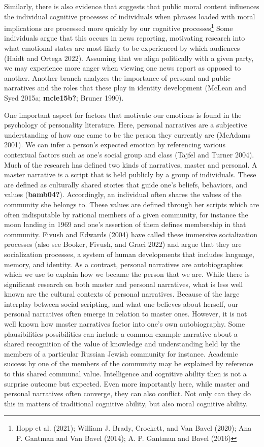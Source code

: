 \documentclass[12pt]{book}
\theoremstyle{definition}
\theoremstyle{remark}
\begin{document}
Similarly, there is also evidence that suggests that public moral content influences the individual cognitive processes of individuals when phrases loaded with moral implications are processed more quickly by our cognitive processes\footnote{Hopp et al. (2021); William J. Brady, Crockett, and Van Bavel (2020); Ana P. Gantman and Van Bavel (2014); A. P. Gantman and Bavel (2016)} Some individuals argue that this occurs in news reporting, motivating research into what emotional states are most likely to be experienced by which audiences (Haidt and Ortega 2022). Assuming that we align politically with a given party, we may experience more anger when viewing one news report as opposed to another. Another branch analyzes the importance of personal and public narratives and the roles that these play in identity development (McLean and Syed 2015a; \textbf{mcle15b?}; Bruner 1990).

One important aspect for factors that motivate our emotions is found in the psychology of personality literature. Here, personal narratives are a subjective understanding of how one came to be the person they currently are (McAdams 2001). We can infer a person's expected emotion by referencing various contextual factors such as one's social group and class (Tajfel and Turner 2004). Much of the research has defined two kinds of narratives, master and personal. A master narrative is a script that is held publicly by a group of individuals. These are defined as culturally shared stories that guide one's beliefs, behaviors, and values (\textbf{bamb04?}). Accordingly, an individual often shares the values of the community she belongs to. These values are defined through her scripts which are often indisputable by rational members of a given community, for instance the moon landing in 1969 and one's assertion of them defines membership in that community. Fivush and Edwards (2004) have called these immersive socialization processes (also see Booker, Fivush, and Graci 2022) and argue that they are socialization processes, a system of human developments that includes language, memory, and identity. As a contrast, personal narratives are autobiographies which we use to explain how we became the person that we are. While there is significant research on both master and personal narratives, what is less well known are the cultural contexts of personal narratives. Because of the large interplay between social scripting, and what one believes about herself, our personal narratives often emerge in relation to master ones. However, it is not well known how master narratives factor into one's own autobiography. Some plausibilities possibilities can include a common example narrative about a shared recognition of the value of knowledge and understanding held by the members of a particular Russian Jewish community for instance. Academic success by one of the members of the community may be explained by reference to this shared communal value. Intelligence and cognitive ability then is not a surprise outcome but expected. Even more importantly here, while master and personal narratives often converge, they can also conflict. Not only can they do this in matters of traditional cognitive ability, but also moral cognitive ability.
\end{document}

